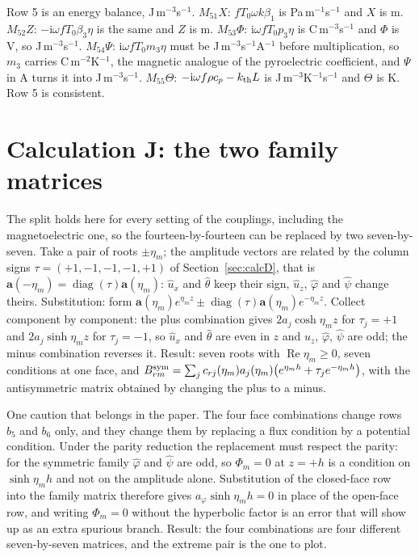 \documentclass[11pt]{article}
\makeatletter
\newif\ifshowworked
\newenvironment{worked}{%
  \ifshowworked\par\smallskip\noindent\textit{Working.}\par\smallskip\else
  \setbox\z@\vbox\bgroup\fi}{\ifshowworked\par\smallskip\else\egroup\fi}
\newcommand{\ii}{\mathrm{i}}
\makeatother
\begin{document}
\begin{worked}
Row 5 is an energy balance, J\,m$^{-3}$s$^{-1}$. $M_{51}X$: $fT_0\omega k\beta_1$ is
Pa\,m$^{-1}$s$^{-1}$ and $X$ is m. $M_{52}Z$: $-\ii\omega fT_0\beta_3\eta$ is the same and $Z$ is m.
$M_{53}\Phi$: $\ii\omega fT_0p_3\eta$ is C\,m$^{-3}$s$^{-1}$ and $\Phi$ is V, so J\,m$^{-3}$s$^{-1}$.
$M_{54}\Psi$: $\ii\omega fT_0m_3\eta$ must be J\,m$^{-3}$s$^{-1}$A$^{-1}$ before multiplication, so $m_3$
carries C\,m$^{-2}$K$^{-1}$, the magnetic analogue of the pyroelectric coefficient, and $\Psi$ in A turns
it into J\,m$^{-3}$s$^{-1}$. $M_{55}\Theta$: $-\ii\omega f\rho c_p-k_{\rm th}L$ is
J\,m$^{-3}$K$^{-1}$s$^{-1}$ and $\Theta$ is K. Row 5 is consistent.
\end{worked}

\section{Calculation J: the two family matrices}

\begin{worked}
The split holds here for every setting of the couplings, including the magnetoelectric one, so the
fourteen-by-fourteen can be replaced by two seven-by-seven. Take a pair of roots $\pm\eta_m$; the amplitude
vectors are related by the column signs $\tau=(+1,-1,-1,-1,+1)$ of Section~\ref{sec:calcD}, that is
$\mathbf a(-\eta_m)=\operatorname{diag}(\tau)\mathbf a(\eta_m)$: $\hat u_x$ and $\hat\theta$ keep their
sign, $\hat u_z$, $\hat\varphi$ and $\hat\psi$ change theirs.
Substitution: form $\mathbf a(\eta_m)e^{\eta_mz}\pm\operatorname{diag}(\tau)\mathbf a(\eta_m)e^{-\eta_mz}$.
Collect component by component: the plus combination gives $2a_j\cosh\eta_mz$ for $\tau_j=+1$ and
$2a_j\sinh\eta_mz$ for $\tau_j=-1$, so $\hat u_x$ and $\hat\theta$ are even in $z$ and $\hat u_z$,
$\hat\varphi$, $\hat\psi$ are odd; the minus combination reverses it.
Result: seven roots with $\operatorname{Re}\eta_m\ge0$, seven conditions at one face, and
$B^{\rm sym}_{rm}=\sum_j c_{rj}(\eta_m)a_j(\eta_m)\bigl(e^{\eta_mh}+\tau_je^{-\eta_mh}\bigr)$, with the
antisymmetric matrix obtained by changing the plus to a minus.
\end{worked}

\begin{worked}
One caution that belongs in the paper. The four face combinations change rows $b_5$ and $b_6$ only, and
they change them by replacing a flux condition by a potential condition. Under the parity reduction the
replacement must respect the parity: for the symmetric family $\hat\varphi$ and $\hat\psi$ are odd, so
$\Phi_m=0$ at $z=+h$ is a condition on $\sinh\eta_mh$ and not on the amplitude alone. Substitution of the
closed-face row into the family matrix therefore gives $a_\varphi\sinh\eta_mh=0$ in place of the open-face
row, and writing $\Phi_m=0$ without the hyperbolic factor is an error that will show up as an extra
spurious branch. Result: the four combinations are four different seven-by-seven matrices, and the extreme
pair is the one to plot.
\end{worked}
\end{document}
